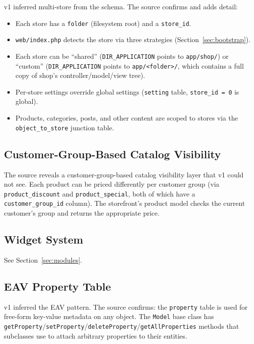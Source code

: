 \documentclass[11pt,a4paper]{article}
\begin{document}
v1 inferred multi-store from the schema. The source confirms and
adds detail:

\begin{itemize}[leftmargin=1.6em,itemsep=2pt]
  \item Each store has a \texttt{folder} (filesystem root) and a
        \texttt{store\_id}.
  \item \texttt{web/index.php} detects the store via three
        strategies (Section~\ref{sec:bootstrap}).
  \item Each store can be ``shared'' (\texttt{DIR\_APPLICATION}
        points to \texttt{app/shop/}) or ``custom''
        (\texttt{DIR\_APPLICATION} points to
        \texttt{app/<folder>/}, which contains a full copy of
        shop's controller/model/view tree).
  \item Per-store settings override global settings
        (\texttt{setting} table, \texttt{store\_id = 0} is global).
  \item Products, categories, posts, and other content are scoped
        to stores via the \texttt{object\_to\_store} junction
        table.
\end{itemize}

\subsection{Customer-Group-Based Catalog Visibility}

The source reveals a customer-group-based catalog visibility layer
that v1 could not see. Each product can be priced differently per
customer group (via \texttt{product\_discount} and
\texttt{product\_special}, both of which have a
\texttt{customer\_group\_id} column). The storefront's product
model checks the current customer's group and returns the
appropriate price.

\subsection{Widget System}

See Section~\ref{sec:modules}.

\subsection{EAV Property Table}

v1 inferred the EAV pattern. The source confirms: the
\texttt{property} table is used for free-form key-value metadata on
any object. The \texttt{Model} base class has
\texttt{getProperty}/\texttt{setProperty}/\texttt{deleteProperty}/\texttt{getAllProperties}
methods that subclasses use to attach arbitrary properties to
their entities.
\end{document}

